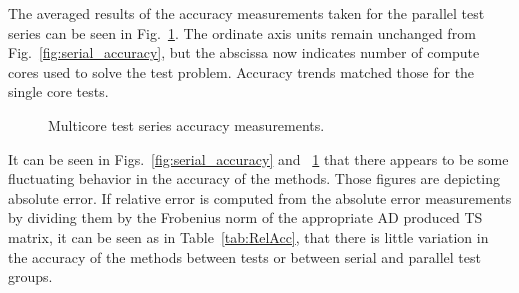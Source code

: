 \documentclass[preprint,12pt]{elsarticle}
\begin{document}
%
The averaged results of the accuracy measurements taken for the parallel test
series can be seen in Fig.~\ref{fig:multi_accuracy}. The ordinate axis units
remain unchanged from Fig.~\ref{fig:serial_accuracy}, but the abscissa now
indicates number of compute cores used to solve the test problem. Accuracy
trends matched those for the single core tests. 
%
\begin{figure}[tbp] \centering
\scalebox{1.0}{} \caption{Multicore test
series accuracy measurements.} \label{fig:multi_accuracy} \end{figure}
%
It can be seen in Figs.~\ref{fig:serial_accuracy} and ~\ref{fig:multi_accuracy} that there appears to be some fluctuating behavior in the accuracy of the methods. Those figures are depicting absolute error. If relative error is computed from the absolute error measurements by dividing them by the Frobenius norm of the appropriate AD produced TS matrix, it can be seen as in Table~\ref{tab:RelAcc}, that there is little variation in the accuracy of the methods between tests or between serial and parallel test groups. 
\end{document}
